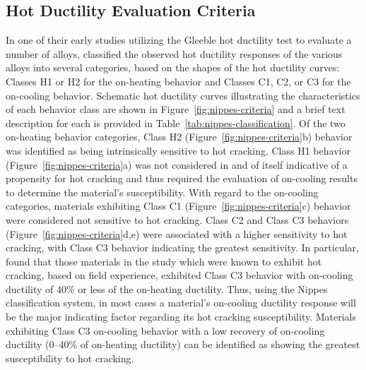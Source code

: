 \subsection{Hot Ductility Evaluation Criteria}
In one of their early studies utilizing the Gleeble hot ductility test to evaluate a number of alloys, \citet{nippes_further_1957} classified the observed hot ductility responses of the various alloys into several categories, based on the shapes of the hot ductility curves: Classes H1 or H2 for the on-heating behavior and Classes C1, C2, or C3 for the on-cooling behavior. Schematic hot ductility curves illustrating the characteristics of each behavior class are shown in Figure~\ref{fig:nippes-criteria} and a brief text description for each is provided in Table~\ref{tab:nippes-classification}. Of the two on-heating behavior categories, Class H2 (Figure~\ref{fig:nippes-criteria}b) behavior was identified as being intrinsically sensitive to hot cracking. Class H1 behavior (Figure~\ref{fig:nippes-criteria}a) was not considered in and of itself indicative of a propensity for hot cracking and thus required the evaluation of on-cooling results to determine the material's susceptibility. With regard to the on-cooling categories, materials exhibiting Class C1 (Figure~\ref{fig:nippes-criteria}c) behavior were considered not sensitive to hot cracking. Class C2 and Class C3 behaviors (Figure~\ref{fig:nippes-criteria}d,e) were associated with a higher sensitivity to hot cracking, with Class C3 behavior indicating the greatest sensitivity. In particular, \citeauthor{nippes_further_1957} found that those materials in the study which were known to exhibit hot cracking, based on field experience, exhibited Class C3 behavior with on-cooling ductility of 40\% or less of the on-heating ductility. Thus, using the Nippes classification system, in most cases a material's on-cooling ductility response will be the major indicating factor regarding its hot cracking susceptibility. Materials exhibiting Class C3 on-cooling behavior with a low recovery of on-cooling ductility (0--40\% of on-heating ductility) can be identified as showing the greatest susceptibility to hot cracking.

